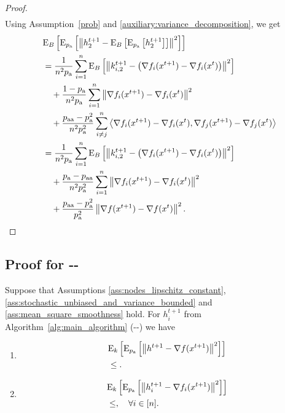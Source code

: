 \documentclass{article}
\newcommand*{\probavailable}{\ensuremath{p_{\textnormal{a}}}}
\newcommand*{\probpairaa}{\ensuremath{p_{\textnormal{aa}}}}
\begin{document}
\begin{proof}
\begin{align*}
  \end{align*}
  Using Assumption~\ref{prob} and \eqref{auxiliary:variance_decomposition}, we get
  \begin{align*}
    &\ExpSub{B}{\ExpSub{\probavailable}{\norm{h^{t+1}_{2} - \ExpSub{B}{\ExpSub{\probavailable}{h^{t+1}_{2}}}}^2}}\\
    &=\frac{1}{n^2 \probavailable}\sum_{i=1}^n\ExpSub{B}{\norm{k^{t+1}_{i, 2} - \left(\nabla f_i(x^{t+1}) - \nabla f_i(x^{t})\right)}^2} \\
    &\quad + \frac{1 - \probavailable}{n^2 \probavailable}\sum_{i=1}^n\norm{\nabla f_i(x^{t+1}) - \nabla f_i(x^{t})}^2 \\
    &\quad +\frac{\probpairaa - \probavailable^2}{n^2 \probavailable^2}\sum_{i\neq j}^n\inp{\nabla f_i(x^{t+1}) - \nabla f_i(x^{t})}{\nabla f_j(x^{t+1}) - \nabla f_j(x^{t})} \\
    &=\frac{1}{n^2 \probavailable}\sum_{i=1}^n\ExpSub{B}{\norm{k^{t+1}_{i, 2} - \left(\nabla f_i(x^{t+1}) - \nabla f_i(x^{t})\right)}^2} \\
    &\quad + \frac{\probavailable - \probpairaa}{n^2 \probavailable^2}\sum_{i=1}^n\norm{\nabla f_i(x^{t+1}) - \nabla f_i(x^{t})}^2 \\
    &\quad +\frac{\probpairaa - \probavailable^2}{\probavailable^2}\norm{\nabla f(x^{t+1}) - \nabla f(x^{t})}^2.
  \end{align*}
\end{proof}

\subsection{Proof for --}
\begin{lemma}
  Suppose that Assumptions \ref{ass:nodes_lipschitz_constant}, \ref{ass:stochastic_unbiased_and_variance_bounded} and \ref{ass:mean_square_smoothness} hold. For $h^{t+1}_i$ from Algorithm~\ref{alg:main_algorithm} (--) we have
  \begin{enumerate}
  \item
      \begin{align*}
          &\ExpSub{k}{\ExpSub{\probavailable}{\norm{h^{t+1} - \nabla f(x^{t+1})}^2}} \\
          & \leq .
      \end{align*}
  \item
      \begin{align*}
          &\ExpSub{k}{\ExpSub{\probavailable}{\norm{h^{t+1}_i - \nabla f_i(x^{t+1})}^2}} \\
          & \leq , \quad \forall i \in [n].
      \end{align*}
  \end{enumerate}
\end{lemma}
\end{document}
